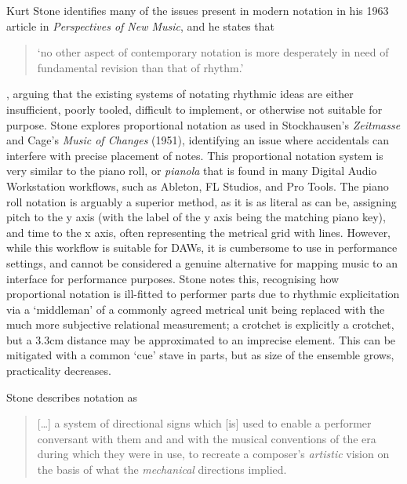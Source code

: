 Kurt Stone identifies many of the issues present in modern notation in his 1963 article in \emph{Perspectives of New Music}, and he states that \begin{quotation}
    `no other aspect of contemporary notation is more desperately in need of fundamental revision than that of rhythm.'
\end{quotation}, arguing that the existing systems of notating rhythmic ideas are either insufficient, poorly tooled, difficult to implement, or otherwise not suitable for purpose.\autocite[20--22]{stoneProblemsMethodsNotation1963}
Stone explores proportional notation as used in Stockhausen's \emph{Zeitmasse} and Cage's \emph{Music of Changes} (1951), identifying an issue where accidentals can interfere with precise placement of notes. 
This proportional notation system is very similar to the piano roll, or \emph{pianola} that is found in many Digital Audio Workstation workflows, such as Ableton, FL Studios, and Pro Tools.
The piano roll notation is arguably a superior method, as it is as literal as can be, assigning pitch to the y axis (with the label of the y axis being the matching piano key), and time to the x axis, often representing the metrical grid with lines.
However, while this workflow is suitable for DAWs, it is cumbersome to use in performance settings, and cannot be considered a genuine alternative for mapping music to an interface for performance purposes.
Stone notes this, recognising how proportional notation is ill-fitted to performer parts due to rhythmic explicitation via a `middleman' of a commonly agreed metrical unit being replaced with the much more subjective relational measurement; a crotchet is explicitly a crotchet, but a 3.3cm distance may be approximated to an imprecise element.
This can be mitigated with a common `cue' stave in parts, but as size of the ensemble grows, practicality decreases.

Stone describes notation as \begin{quotation}
    [\dots] a system of directional signs which [is] used to enable a performer conversant with them and and with the musical conventions of the era during which they were in use, to recreate a composer's \emph{artistic} vision on the basis of what the \emph{mechanical} directions implied.
\end{quotation}


